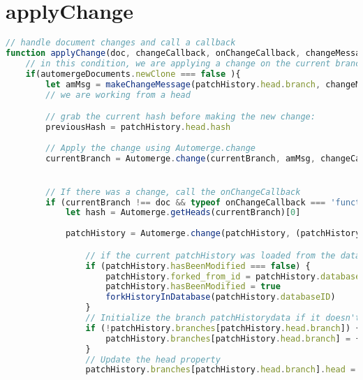 \section{applyChange}

\begin{lstlisting}[language=JavaScript, caption={applyChange() manages Automerge document updates within Forking Paths. If the user is working on the current branch, the function applies changes directly and appends a new commit to that branch’s history. If the user is editing a past state (i.e., newClone is true), the function forks a new branch, applies the change, and updates the patch history metadata accordingly. In both cases, the current Automerge document is saved, a new hash is generated, and the onChangeCallback is triggered to sync peers, update the UI, and redraw the version history graph.}, label={lst:applyChange}]
// handle document changes and call a callback
function applyChange(doc, changeCallback, onChangeCallback, changeMessage) {
    // in this condition, we are applying a change on the current branch
    if(automergeDocuments.newClone === false ){
        let amMsg = makeChangeMessage(patchHistory.head.branch, changeMessage)
        // we are working from a head

        // grab the current hash before making the new change:
        previousHash = patchHistory.head.hash
        
        // Apply the change using Automerge.change
        currentBranch = Automerge.change(currentBranch, amMsg, changeCallback);


        // If there was a change, call the onChangeCallback
        if (currentBranch !== doc && typeof onChangeCallback === 'function') {
            let hash = Automerge.getHeads(currentBranch)[0]
            
            patchHistory = Automerge.change(patchHistory, (patchHistory) => {

                // if the current patchHistory was loaded from the database, then we need to create a fork for this new change
                if (patchHistory.hasBeenModified === false) {
                    patchHistory.forked_from_id = patchHistory.databaseID
                    patchHistory.hasBeenModified = true
                    forkHistoryInDatabase(patchHistory.databaseID)
                }
                // Initialize the branch patchHistorydata if it doesn't already exist
                if (!patchHistory.branches[patchHistory.head.branch]) {
                    patchHistory.branches[patchHistory.head.branch] = { head: null, history: [] };
                }
                // Update the head property
                patchHistory.branches[patchHistory.head.branch].head = hash;


\end{lstlisting}
